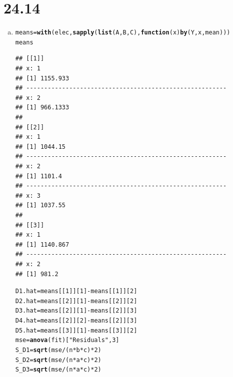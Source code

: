 \documentclass{article}\usepackage[]{graphicx}\usepackage[]{color}
\makeatletter
\newcommand{\hlnum}[1]{\textcolor[rgb]{0.686,0.059,0.569}{#1}}%
\newcommand{\hlstr}[1]{\textcolor[rgb]{0.192,0.494,0.8}{#1}}%
\newcommand{\hlopt}[1]{\textcolor[rgb]{0,0,0}{#1}}%
\newcommand{\hlstd}[1]{\textcolor[rgb]{0.345,0.345,0.345}{#1}}%
\newcommand{\hlkwa}[1]{\textcolor[rgb]{0.161,0.373,0.58}{\textbf{#1}}}%
\newcommand{\hlkwb}[1]{\textcolor[rgb]{0.69,0.353,0.396}{#1}}%
\newcommand{\hlkwc}[1]{\textcolor[rgb]{0.333,0.667,0.333}{#1}}%
\newcommand{\hlkwd}[1]{\textcolor[rgb]{0.737,0.353,0.396}{\textbf{#1}}}%
\newenvironment{kframe}{%
 \def\at@end@of@kframe{}%
 \ifinner\ifhmode%
  \def\at@end@of@kframe{\end{minipage}}%
  \begin{minipage}{\columnwidth}%
 \fi\fi%
 \def\FrameCommand##1{\hskip\@totalleftmargin \hskip-\fboxsep
 \colorbox{shadecolor}{##1}\hskip-\fboxsep
     \hskip-\linewidth \hskip-\@totalleftmargin \hskip\columnwidth}%
 \MakeFramed {\advance\hsize-\width
   \@totalleftmargin\z@ \linewidth\hsize
   \@setminipage}}%
 {\par\unskip\endMakeFramed%
 \at@end@of@kframe}
\newenvironment{knitrout}{}{} %
\makeatother
\begin{document}
\section{24.14}

\begin{enumerate}[(a)]

\item

\begin{knitrout}
\color{fgcolor}\begin{kframe}
\begin{alltt}
  \hlstd{means} \hlkwb{=} \hlkwd{with}\hlstd{(elec,} \hlkwd{sapply}\hlstd{(}\hlkwd{list}\hlstd{(A, B, C),} \hlkwa{function}\hlstd{(}\hlkwc{x}\hlstd{)} \hlkwd{by}\hlstd{(Y, x, mean)))}
  \hlstd{means}
\end{alltt}
\begin{verbatim}
## [[1]]
## x: 1
## [1] 1155.933
## -------------------------------------------------------- 
## x: 2
## [1] 966.1333
## 
## [[2]]
## x: 1
## [1] 1044.15
## -------------------------------------------------------- 
## x: 2
## [1] 1101.4
## -------------------------------------------------------- 
## x: 3
## [1] 1037.55
## 
## [[3]]
## x: 1
## [1] 1140.867
## -------------------------------------------------------- 
## x: 2
## [1] 981.2
\end{verbatim}
\begin{alltt}
  \hlstd{D1.hat} \hlkwb{=} \hlstd{means[[}\hlnum{1}\hlstd{]][}\hlnum{1}\hlstd{]} \hlopt{-} \hlstd{means[[}\hlnum{1}\hlstd{]][}\hlnum{2}\hlstd{]}
  \hlstd{D2.hat} \hlkwb{=} \hlstd{means[[}\hlnum{2}\hlstd{]][}\hlnum{1}\hlstd{]} \hlopt{-} \hlstd{means[[}\hlnum{2}\hlstd{]][}\hlnum{2}\hlstd{]}
  \hlstd{D3.hat} \hlkwb{=} \hlstd{means[[}\hlnum{2}\hlstd{]][}\hlnum{1}\hlstd{]} \hlopt{-} \hlstd{means[[}\hlnum{2}\hlstd{]][}\hlnum{3}\hlstd{]}
  \hlstd{D4.hat} \hlkwb{=} \hlstd{means[[}\hlnum{2}\hlstd{]][}\hlnum{2}\hlstd{]} \hlopt{-} \hlstd{means[[}\hlnum{2}\hlstd{]][}\hlnum{3}\hlstd{]}
  \hlstd{D5.hat} \hlkwb{=} \hlstd{means[[}\hlnum{3}\hlstd{]][}\hlnum{1}\hlstd{]} \hlopt{-} \hlstd{means[[}\hlnum{3}\hlstd{]][}\hlnum{2}\hlstd{]}
  \hlstd{mse} \hlkwb{=} \hlkwd{anova}\hlstd{(fit)[}\hlstr{"Residuals"}\hlstd{,} \hlnum{3}\hlstd{]}
  \hlstd{S_D1} \hlkwb{=} \hlkwd{sqrt}\hlstd{(mse}\hlopt{/}\hlstd{(n}\hlopt{*}\hlstd{b}\hlopt{*}\hlstd{c)}\hlopt{*}\hlnum{2}\hlstd{)}
  \hlstd{S_D2} \hlkwb{=} \hlkwd{sqrt}\hlstd{(mse}\hlopt{/}\hlstd{(n}\hlopt{*}\hlstd{a}\hlopt{*}\hlstd{c)}\hlopt{*}\hlnum{2}\hlstd{)}
  \hlstd{S_D3} \hlkwb{=} \hlkwd{sqrt}\hlstd{(mse}\hlopt{/}\hlstd{(n}\hlopt{*}\hlstd{a}\hlopt{*}\hlstd{c)}\hlopt{*}\hlnum{2}\hlstd{)}

\end{alltt}
\end{kframe}
\end{knitrout}
\end{enumerate}
\end{document}
